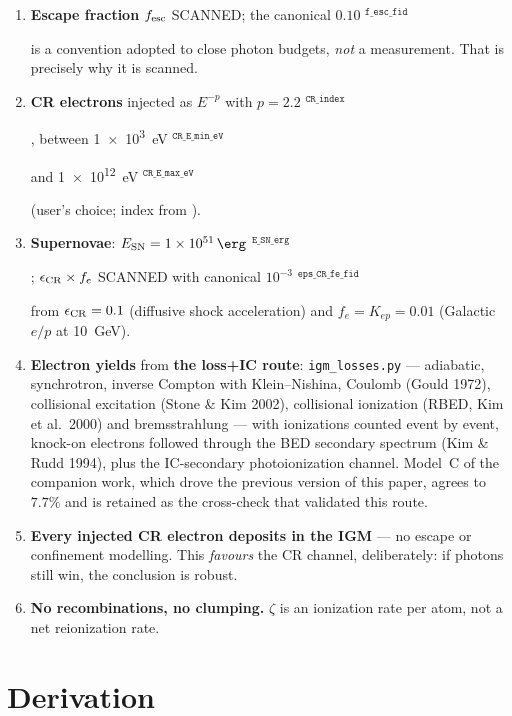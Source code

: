 \documentclass[11pt,a4paper]{article}
\newif\ifprovdraft
\newcommand{\src}[1]{%
  \ifprovdraft
    \ifmmode{}^{\text{\color{gray}\scriptsize\texttt{#1}}}%
    \else{\color{gray}\scriptsize$^{\texttt{#1}}$}%
    \fi
  \fi}
\begin{document}
\begin{enumerate}
      \emph{not} invented. The shape is carried by the standard parametrisation
      for reionization-era sources, $f_\nu\propto\nu^{-\alpha}$ across 1--4~Ryd
      (photon number $dN/dE\propto E^{-(\alpha+1)}$), with $\alpha$
      \emph{bracketed} over 1--3 rather than asserted. \S\ref{sec:sed} shows the
      conclusion does not depend on it. The $T_{\rm eff} =
      \SI{5e4}{\kelvin}$\src{T\_eff\_K} blackbody is retained as a comparison.
\item \textbf{Escape fraction} $f_{\rm esc}$ SCANNED; the canonical
      $0.10$\src{f\_esc\_fid} is a convention adopted to close photon budgets,
      \emph{not} a measurement. That is precisely why it is scanned.
\item \textbf{CR electrons} injected as $E^{-p}$ with
      $p = 2.2$\src{CR\_index}, between
      \SI{1e3}{\electronvolt}\src{CR\_E\_min\_eV} and
      \SI{1e12}{\electronvolt}\src{CR\_E\_max\_eV} (user's choice; index from
      \cite{leite17}).
\item \textbf{Supernovae}: $E_{\rm SN} = \SI{1e51}{\erg}$\src{E\_SN\_erg};
      $\epsilon_{\rm CR}\times f_e$ SCANNED with canonical
      $10^{-3}$\src{eps\_CR\_fe\_fid} from $\epsilon_{\rm CR}=0.1$ (diffusive
      shock acceleration) and $f_e = K_{ep} = 0.01$ (Galactic $e/p$ at 10~GeV).
\item \textbf{Electron yields} from \textbf{the loss+IC route}: \texttt{igm\_losses.py}
      --- adiabatic, synchrotron, inverse Compton with Klein--Nishina, Coulomb
      (Gould 1972), collisional excitation (Stone \& Kim 2002), collisional
      ionization (RBED, Kim et al.\ 2000) and bremsstrahlung --- with
      ionizations counted event by event, knock-on electrons followed through
      the BED secondary spectrum (Kim \& Rudd 1994), plus the IC-secondary
      photoionization channel. Model~C of the companion work, which drove the
      previous version of this paper, agrees to $7.7\%$ and is retained as the
      cross-check that validated this route.
\item \textbf{Every injected CR electron deposits in the IGM} --- no escape or
      confinement modelling. This \emph{favours} the CR channel, deliberately: if
      photons still win, the conclusion is robust.
\item \textbf{No recombinations, no clumping.} $\zeta$ is an ionization rate per
      atom, not a net reionization rate.
\end{enumerate}

\section{Derivation}
\end{document}

